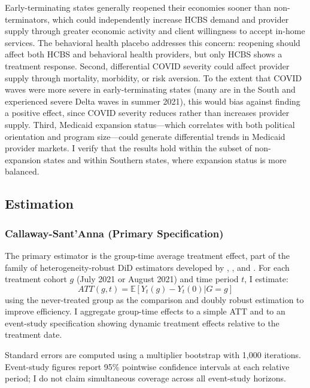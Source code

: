 \documentclass[12pt]{article}
\newcommand{\E}{\mathbb{E}}
\begin{document}
Early-terminating states generally reopened their economies sooner than non-terminators, which could independently increase HCBS demand and provider supply through greater economic activity and client willingness to accept in-home services. The behavioral health placebo addresses this concern: reopening should affect both HCBS and behavioral health providers, but only HCBS shows a treatment response. Second, differential COVID severity could affect provider supply through mortality, morbidity, or risk aversion. To the extent that COVID waves were more severe in early-terminating states (many are in the South and experienced severe Delta waves in summer 2021), this would bias against finding a positive effect, since COVID severity reduces rather than increases provider supply. Third, Medicaid expansion status---which correlates with both political orientation and program size---could generate differential trends in Medicaid provider markets. I verify that the results hold within the subset of non-expansion states and within Southern states, where expansion status is more balanced.

\subsection{Estimation}

\subsubsection{Callaway-Sant'Anna (Primary Specification)}

The primary estimator is the \citet{callaway2021} group-time average treatment effect, part of the family of heterogeneity-robust DiD estimators developed by \citet{dechaisemartin2020}, \citet{sun2021}, and \citet{borusyak2024}. For each treatment cohort $g$ (July 2021 or August 2021) and time period $t$, I estimate:
\begin{equation}
ATT(g,t) = \E[Y_t(g) - Y_t(0) | G = g]
\end{equation}
using the never-treated group as the comparison and doubly robust estimation to improve efficiency. I aggregate group-time effects to a simple ATT and to an event-study specification showing dynamic treatment effects relative to the treatment date.

Standard errors are computed using a multiplier bootstrap with 1,000 iterations. Event-study figures report 95\% pointwise confidence intervals at each relative period; I do not claim simultaneous coverage across all event-study horizons.
\end{document}
